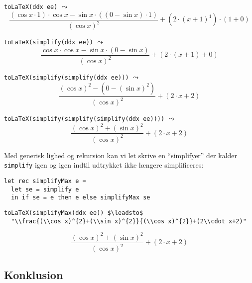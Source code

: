 \documentclass[rgb]{beamer}
\begin{document}
\begin{frame}[fragile]
\begin{footnotesize}


  \vspace{1ex}
  \lstinline{toLaTeX(ddx ee)} $\leadsto$
  \[
  \frac{(\cos x\cdot 1)\cdot \cos x-\sin x\cdot ((0-\sin x)\cdot 1)}{(\cos x)^{2}}+(2\cdot (x+1)^{1})\cdot (1+0)
  \]

  \vspace{1ex}
  \lstinline{toLaTeX(simplify(ddx ee))} $\leadsto$
  \[
  \frac{\cos x\cdot \cos x-\sin x\cdot (0-\sin x)}{(\cos x)^{2}}+(2\cdot (x+1)+0)
  \]

  \vspace{1ex}
  \lstinline{toLaTeX(simplify(simplify(ddx ee)))} $\leadsto$
  \[
  \frac{(\cos x)^{2}-(0-(\sin x)^{2})}{(\cos x)^{2}}+(2\cdot x+2)
  \]

  \vspace{1ex}
  \lstinline{toLaTeX(simplify(simplify(simplify(ddx ee))))} $\leadsto$
  \[
  \frac{(\cos x)^{2}+(\sin x)^{2}}{(\cos x)^{2}}+(2\cdot x+2)
  \]

\end{footnotesize}
\end{frame}

\begin{frame}[fragile]
\begin{footnotesize}


  \vspace{1ex}

  Med generisk lighed og rekursion kan vi let skrive en ``simplifyer''
  der kalder \lstinline{simplify} igen og igen indtil udtrykket ikke
  længere simplificeres:

\begin{lstlisting}[numbers=none,frame=none,mathescape]
let rec simplifyMax e =
  let se = simplify e
  in if se = e then e else simplifyMax se
\end{lstlisting}

\vspace{1ex}

\begin{lstlisting}[numbers=none,frame=none,mathescape]
toLaTeX(simplifyMax(ddx ee)) $\leadsto$
  "\\frac{(\\cos x)^{2}+(\\sin x)^{2}}{(\\cos x)^{2}}+(2\\cdot x+2)"
\end{lstlisting}

\vspace{1ex}

  \[
  \frac{(\cos x)^{2}+(\sin x)^{2}}{(\cos x)^{2}}+(2\cdot x+2)
  \]

\end{footnotesize}
\end{frame}

\subsection*{Konklusion}
\begin{frame}[fragile]

  \vspace{3mm}
  \tableofcontents
\end{frame}
\end{document}
